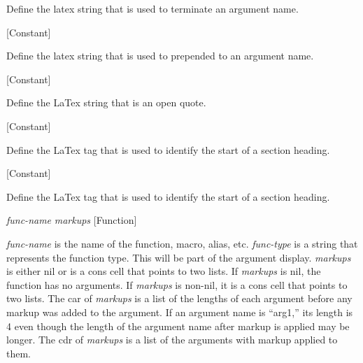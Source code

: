 \begin{doc-string}
Define the latex string that is used to terminate an argument name.
\end{doc-string}

\vspace{1em}
\noindent
{}
\usebox{\funcname}
 \hfill [Constant]

\begin{doc-string}
Define the latex string that is used to prepended to an argument name.
\end{doc-string}

\vspace{1em}
\noindent
{}
\usebox{\funcname}
 \hfill [Constant]

\begin{doc-string}
Define the LaTex string that is an open quote.
\end{doc-string}

\vspace{1em}
\noindent
{}
\usebox{\funcname}
 \hfill [Constant]

\begin{doc-string}
Define the LaTex tag that is used to identify the start of a section heading.
\end{doc-string}

\vspace{1em}
\noindent
{}
\usebox{\funcname}
 \hfill [Constant]

\begin{doc-string}
Define the LaTex tag that is used to identify the start of a section heading.
\end{doc-string}

\vspace{1em}
\noindent
{}
\usebox{\funcname}\emph{func-name} \emph{markups}
 \hfill [Function]
\hspace*{\wd\funcname}

\begin{doc-string}
\emph{func-name} is the name of the function, macro, alias, etc.  \emph{func-type} is a
string that represents the function type.  This will be part of the argument
display.  \emph{markups} is either nil or is a cons cell that points to two lists.  If
\emph{markups} is nil, the function has no arguments.  If \emph{markups} is non-nil, it is a
cons cell that points to two lists.  The car of \emph{markups} is a list of the lengths
of each argument before any markup was added to the argument.  If an argument
name is ``arg1,'' its length is 4 even though the length of the argument name
after markup is applied may be longer.  The cdr of \emph{markups} is a list of the
arguments with markup applied to them.
\end{doc-string}

